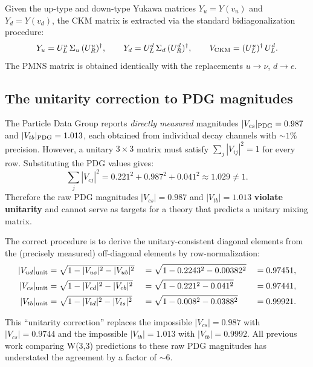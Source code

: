 \documentclass[11pt,a4paper]{article}
\theoremstyle{definition}
\theoremstyle{remark}
\begin{document}
Given the up-type and down-type Yukawa matrices $Y_u = Y(v_u)$ and $Y_d = Y(v_d)$,
the CKM matrix is extracted via the standard bidiagonalization procedure:
\[
    Y_u = U_L^u \,\Sigma_u\, (U_R^u)^\dagger,
    \qquad
    Y_d = U_L^d \,\Sigma_d\, (U_R^d)^\dagger,
    \qquad
    V_{\rm CKM} = (U_L^u)^\dagger \,U_L^d.
\]
The PMNS matrix is obtained identically with the replacements $u \to \nu$, $d \to e$.

\subsection{The unitarity correction to PDG magnitudes}

\begin{remarkbox}
The Particle Data Group reports \emph{directly measured} magnitudes
$|V_{cs}|_{\rm PDG} = 0.987$ and $|V_{tb}|_{\rm PDG} = 1.013$, each obtained from
individual decay channels with $\sim 1\%$ precision.  However, a unitary $3\times 3$
matrix must satisfy $\sum_j |V_{ij}|^2 = 1$ for every row.  Substituting the
PDG values gives:
\[
    \sum_j |V_{cj}|^2 = 0.221^2 + 0.987^2 + 0.041^2 \approx 1.029 \neq 1.
\]
Therefore the raw PDG magnitudes $|V_{cs}| = 0.987$ and $|V_{tb}| = 1.013$
\textbf{violate unitarity} and cannot serve as targets for a theory that
predicts a unitary mixing matrix.
\end{remarkbox}

The correct procedure is to derive the unitary-consistent diagonal elements
from the (precisely measured) off-diagonal elements by row-normalization:
\begin{alignat}{3}
    |V_{ud}|_{\rm unit} &= \sqrt{1 - |V_{us}|^2 - |V_{ub}|^2}
    &&= \sqrt{1 - 0.2243^2 - 0.00382^2} &&= 0.97451,\label{eq:vud}\\
    |V_{cs}|_{\rm unit} &= \sqrt{1 - |V_{cd}|^2 - |V_{cb}|^2}
    &&= \sqrt{1 - 0.221^2 - 0.041^2}    &&= 0.97441,\label{eq:vcs}\\
    |V_{tb}|_{\rm unit} &= \sqrt{1 - |V_{td}|^2 - |V_{ts}|^2}
    &&= \sqrt{1 - 0.008^2 - 0.0388^2}  &&= 0.99921.\label{eq:vtb}
\end{alignat}

This ``unitarity correction'' replaces the impossible $|V_{cs}| = 0.987$ with
$|V_{cs}| = 0.9744$ and the impossible $|V_{tb}| = 1.013$ with $|V_{tb}| = 0.9992$.
All previous work comparing W(3,3) predictions to these raw PDG magnitudes has
understated the agreement by a factor of $\sim 6$.
\end{document}
